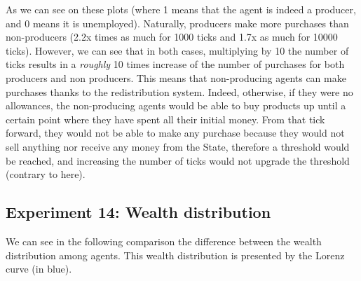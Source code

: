 {{{{{{{{{{{{{    As we can see on these plots (where 1 means that the agent is indeed a producer, and 0 means it is unemployed). Naturally, producers make more purchases than non-producers (2.2x times as much for 1000 ticks and 1.7x as much for 10000 ticks). However, we can see that in both cases, multiplying by 10 the number of ticks results in a \emph{roughly} 10 times increase of the number of purchases for both producers and non producers. This means that  non-producing agents can make purchases thanks to the redistribution system. Indeed, otherwise, if they were no allowances, the non-producing agents would be able to buy products up until a certain point where they have spent all their initial money. From that tick forward, they would not be able to make any purchase because they would not sell anything nor receive any money from the State, therefore a threshold would be reached, and increasing the number of ticks would not upgrade the threshold (contrary to here).
    

    \subsection{Experiment 14: Wealth distribution}
    We can see in the following comparison the difference between the wealth distribution among agents. This wealth distribution is presented by the Lorenz curve (in blue). 

}}}}}}}}}}}}}
